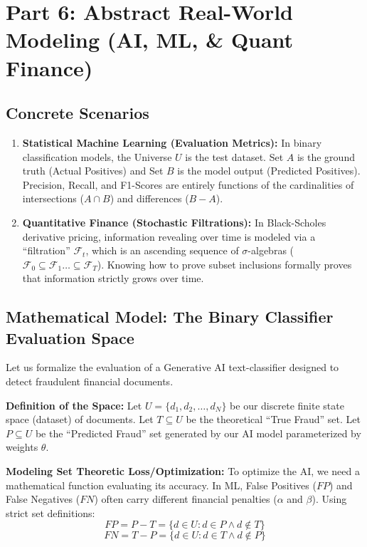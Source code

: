 \documentclass[11pt]{article}
\begin{document}
\section{Part 6: Abstract Real-World Modeling (AI, ML, \& Quant Finance)}

\subsection{Concrete Scenarios}
\begin{enumerate}
    \item \textbf{Statistical Machine Learning (Evaluation Metrics):} In binary classification models, the Universe $U$ is the test dataset. Set $A$ is the ground truth (Actual Positives) and Set $B$ is the model output (Predicted Positives). Precision, Recall, and F1-Scores are entirely functions of the cardinalities of intersections ($A \cap B$) and differences ($B - A$).
    \item \textbf{Quantitative Finance (Stochastic Filtrations):} In Black-Scholes derivative pricing, information revealing over time is modeled via a ``filtration'' $\mathcal{F}_t$, which is an ascending sequence of $\sigma$-algebras ($\mathcal{F}_0 \subseteq \mathcal{F}_1 \dots \subseteq \mathcal{F}_T$). Knowing how to prove subset inclusions formally proves that information strictly grows over time.
\end{enumerate}

\subsection{Mathematical Model: The Binary Classifier Evaluation Space}
Let us formalize the evaluation of a Generative AI text-classifier designed to detect fraudulent financial documents. 

\textbf{Definition of the Space:} 
Let $U = \{d_1, d_2, \dots, d_N\}$ be our discrete finite state space (dataset) of documents. 
Let $T \subseteq U$ be the theoretical ``True Fraud'' set. 
Let $P \subseteq U$ be the ``Predicted Fraud'' set generated by our AI model parameterized by weights $\theta$.

\textbf{Modeling Set Theoretic Loss/Optimization:}
To optimize the AI, we need a mathematical function evaluating its accuracy. In ML, False Positives ($FP$) and False Negatives ($FN$) often carry different financial penalties ($\alpha$ and $\beta$). 
Using strict set definitions:
\[ FP = P - T = \{d \in U : d \in P \land d \notin T\} \]
\[ FN = T - P = \{d \in U : d \in T \land d \notin P\} \]
\end{document}
